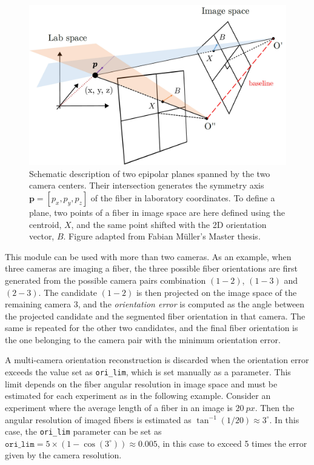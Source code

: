 \documentclass[10pt,a4paper]{article}
\begin{document}
\begin{figure}[ht!]
	\centering
	\includegraphics[width=12cm]{fiber_epipolar_planes.jpg}
	\caption{Schematic description of two epipolar planes spanned by the two camera centers. Their intersection generates the symmetry axis $\textbf{p} = [p_x, p_y, p_z]$ of the fiber in laboratory coordinates. To define a plane, two points of a fiber in image space are here defined using the centroid, $X$, and the same point shifted with the 2D orientation vector, $B$. Figure adapted from Fabian Müller's Master thesis. \label{fig:fiber_planes}}
\end{figure}

This module can be used with more than two cameras. As an example, when three cameras are imaging a fiber, the three possible fiber orientations are first generated from the possible camera pairs combination $(1-2)$, $(1-3)$ and $(2-3)$. The candidate $(1-2)$ is then projected on the image space of the remaining camera $3$, and the \textit{orientation error} is computed as the angle between the projected candidate and the segmented fiber orientation in that camera. The same is repeated for the other two candidates, and the final fiber orientation is the one belonging to the camera pair with the minimum orientation error. 

A multi-camera orientation reconstruction is discarded when the orientation error exceeds the value set as \texttt{ori\_lim}, which is set manually as a parameter. This limit depends on the fiber angular resolution in image space and must be estimated for each experiment as in the following example. Consider an experiment where the average length of a fiber in an image is $20 \ px$. Then the angular resolution of imaged fibers is estimated as $\tan^{-1}(1/20)\approx 3^{\circ}$. In this case, the \texttt{ori\_lim} parameter can be set as $\texttt{ori\_lim} = 5 \times (1 - \cos(3^{\circ})) \approx 0.005$, in this case to exceed 5 times the error given by the camera resolution.
\end{document}

